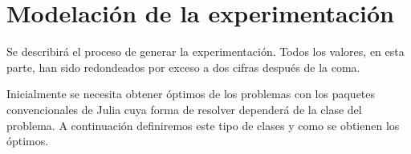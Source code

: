 \section{Modelación de la experimentación}
Se describirá el proceso de generar la experimentación. 
Todos los valores, en esta parte, han sido redondeados por exceso a dos cifras después de la coma. 

Inicialmente se necesita obtener óptimos de los problemas con los paquetes convencionales de Julia
cuya forma de resolver dependerá de la clase del problema. A continuación definiremos este tipo de clases y como se obtienen los óptimos. 


